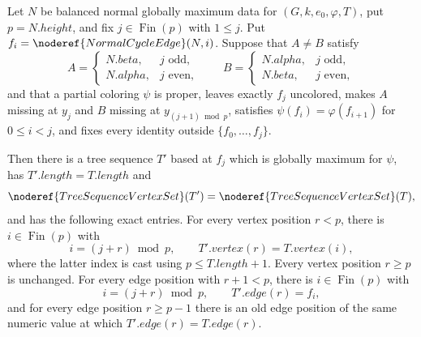 \begin{helper}
Let $N$ be balanced normal globally maximum data for
$(G,k,e_0,\varphi,T)$, put $p=N.height$, and fix
$j\in\operatorname{Fin}(p)$ with $1\leq j$.  Put
$f_i=\noderef{NormalCycleEdge}(N,i)$.  Suppose that $A\ne B$ satisfy
\[
 A=\begin{cases}N.beta,&j\text{ odd},\\N.alpha,&j\text{ even},\end{cases}
 \qquad
 B=\begin{cases}N.alpha,&j\text{ odd},\\N.beta,&j\text{ even},\end{cases}
\]
and that a partial coloring $\psi$ is proper, leaves exactly $f_j$
uncolored, makes $A$ missing at $y_j$ and $B$ missing at
$y_{(j+1)\bmod p}$, satisfies
$\psi(f_i)=\varphi(f_{i+1})$ for $0\leq i<j$, and fixes every identity
outside $\{f_0,\ldots,f_j\}$.

Then there is a tree sequence $T'$ based at $f_j$ which is globally
maximum for $\psi$, has $T'.length=T.length$ and
\[
 \noderef{TreeSequenceVertexSet}(T')=
 \noderef{TreeSequenceVertexSet}(T),
\]
and has the following exact entries.  For every vertex position $r<p$,
there is $i\in\operatorname{Fin}(p)$ with
\[
 i=(j+r)\bmod p,
 \qquad T'.vertex(r)=T.vertex(i),
\]
where the latter index is cast using $p\leq T.length+1$.  Every vertex
position $r\geq p$ is unchanged.  For every edge position with $r+1<p$,
there is $i\in\operatorname{Fin}(p)$ with
\[
 i=(j+r)\bmod p,
 \qquad T'.edge(r)=f_i,
\]
and for every edge position $r\geq p-1$ there is an old edge position of
the same numeric value at which $T'.edge(r)=T.edge(r)$.
\end{helper}
